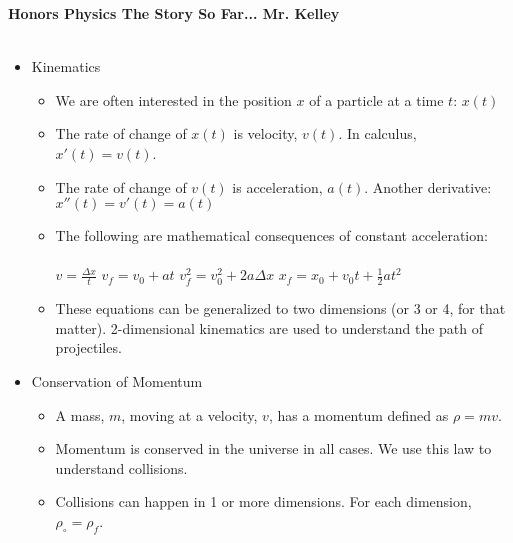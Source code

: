 \documentclass[12pt]{report}
\begin{document}
{\bf{Honors Physics} \hfill {The Story So Far...} \hfill {Mr. Kelley}} \\ \\



\begin{itemize}
\item Kinematics
\begin{itemize}
\item We are often interested in the position $x$ of a particle at a time $t$:   $x(t)$
\item The rate of change of $x(t)$ is velocity, $v(t)$.  In calculus, $x'(t)=v(t)$.
\item The rate of change of $v(t)$ is acceleration, $a(t)$.  Another derivative: $x''(t) = v'(t) = a(t)$
\item The following are mathematical consequences of constant acceleration: \\ \\
$v = \frac{\Delta x}{t}$ \hfill $v_f = v_0 + at$ \hfill $v_f^2 = v_0^2 + 2 a\Delta x$ \hfill $x_f = x_0 + v_0 t + \frac{1}{2}at^2$ \\
\item These equations can be generalized to two dimensions (or 3 or 4, for that matter).  2-dimensional kinematics are used to understand the path of projectiles.
\end{itemize}

\item Conservation of Momentum
\begin{itemize}
\item A mass, $m$, moving at a velocity, $v$, has a momentum defined as $\rho = mv$.
\item Momentum is conserved in the universe in all cases.  We use this law to understand collisions.
\item Collisions can happen in 1 or more dimensions.  For each dimension, $\rho_\circ = \rho_f$.
\end{itemize}


\end{itemize}
\end{document}
